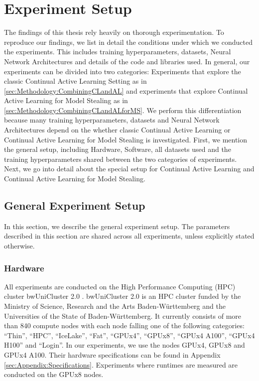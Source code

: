 
\chapter{Experiment Setup}
\label{ch:ExperimentSetup}
The findings of this thesis rely heavily on thorough experimentation. To reproduce our findings, we list in detail the
conditions under which we conducted the experiments. This includes training hyperparameters, datasets, Neural Network Architectures
and details of the code and libraries used. In general, our experiments can be divided into two categories: Experiments that explore
the classic Continual Active Learning Setting as in \ref{sec:Methodology:CombiningCLandAL} and experiments that explore Continual 
Active Learning for Model Stealing as in \ref{sec:Methodology:CombiningCLandALforMS}. We perform this differentiation because many 
training hyperparameters, datasets and Neural Network Architectures depend on the whether classic Continual Active Learning or Continual 
Active Learning for Model Stealing is investigated. First, we mention the general setup, including Hardware, Software, all datasets used
and the training hyperparameters shared between the two categories of experiments. Next, we go into detail about the special setup for
Continual Active Learning and Continual Active Learning for Model Stealing.

\section{General Experiment Setup}
\label{sec:ExperimentSetup:FirstSection}
In this section, we describe the general experiment setup. The parameters described in this section are shared across all experiments, unless
explicitly stated otherwise.

\subsection{Hardware}
\label{sec:ExperimentSetup:Hardware}
All experiments are conducted on the High Performance Computing (HPC) cluster bwUniCluster 2.0 \cite{bwUnicluster}. bwUniCluster 2.0 is an HPC cluster
funded by the Ministry of Science, Research and the Arts Baden-Württemberg and the Universities of the State of Baden-Württemberg. It currently consists
of more than 840 compute nodes with each node falling one of the following categories: \enquote{Thin}, \enquote{HPC}, \enquote{IceLake}, \enquote{Fat},
\enquote{GPUx4}, \enquote{GPUx8}, \enquote{GPUx4 A100}, \enquote{GPUx4 H100} and \enquote{Login}. In our experiments, we use the nodes GPUx4, GPUx8 and
GPUx4 A100. Their hardware specifications can be found in Appendix \ref{sec:Appendix:Specifications}. Experiments where runtimes are measured are
conducted on the GPUx8 nodes.

